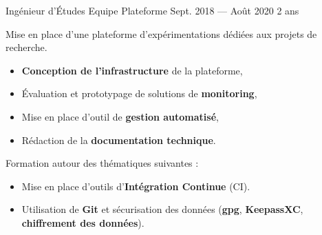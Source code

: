 \jobposition%
{Ingénieur d’Études}%
{Equipe Plateforme}
{Sept. 2018 --- Août 2020}%
{2 ans}%
{
	Mise en place d'une plateforme d'expérimentations dédiées aux projets de
	recherche.
	\vspace{0.5em}
	\begin{itemize}
		\item \textbf{Conception de l'infrastructure} de la plateforme,
		\item Évaluation et prototypage de solutions de \textbf{monitoring},
		\item Mise en place d’outil de \textbf{gestion automatisé},
		\item Rédaction de la \textbf{documentation technique}.
	\end{itemize}
	\vspace{0.5em}
	Formation autour des thématiques suivantes :
	\vspace{0.5em}
	\begin{itemize}
		\item Mise en place d’outils d’\textbf{Intégration Continue} (CI).
		\item Utilisation de \textbf{Git} et sécurisation des données
		      (\textbf{gpg}, \textbf{KeepassXC}, \textbf{chiffrement des données}).
	\end{itemize}
	\vspace{0.5em}

}
